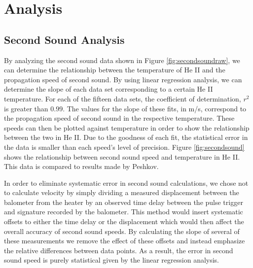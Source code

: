 
\section{Analysis}\label{analysis}
\subsection{Second Sound Analysis}\label{analysis}

By analyzing the second sound data shown in Figure \ref{fig:secondsoundraw}, we can determine the relationship between the temperature of He II and the propagation speed of second sound.  By using linear regression analysis, we can determine the slope of each data set corresponding to a certain He II temperature.  For each of the fifteen data sets, the coefficient of determination, $r^{2}$ is greater than $0.99$.  The values for the slope of these fits, in m/s, correspond to the propagation speed of second sound in the respective temperature.  These speeds can then be plotted against temperature in order to show the relationship between the two in He II.  Due to the goodness of each fit, the statistical error in the data is smaller than each speed's level of precision. Figure \ref{fig:secondsound} shows the relationship between second sound speed and temperature in He II.  This data is compared to results made by Peshkov.\cite{peshkov}

In order to eliminate systematic error in second sound calculations, we chose not to calculate velocity by simply dividing a measured displacement between the balometer from the heater by an observed time delay between the pulse trigger and signature recorded by the balometer. This method would insert systematic offsets to either the time delay or the displacement which would then affect the overall accuracy of second sound speeds.  By calculating the slope of several of these measurements we remove the effect of these offsets and instead emphasize the relative differences between data points.  As a result, the error in second sound speed is purely statistical given by the linear regression analysis.  


